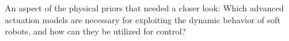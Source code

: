 \begin{researchquestion}\label{rq:actuation_models}
    An aspect of the physical priors that needed a closer look: Which advanced actuation models are necessary for exploiting the dynamic behavior of soft robots, and how can they be utilized for control?
\end{researchquestion}
